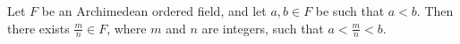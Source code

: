 Let $F$ be an Archimedean ordered field, and let $a, b \in F$ be such that $a < b$. Then there exists $\frac{m}{n} \in F$, where $m$ and $n$ are integers, such that $a < \frac{m}{n} < b$.